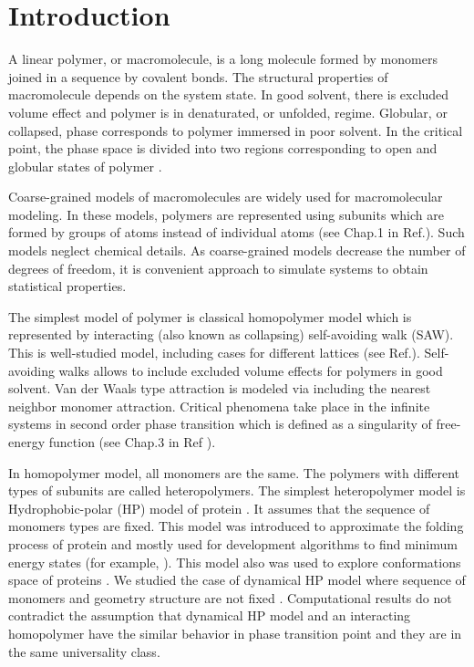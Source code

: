 \chapter{Introduction} \label{ch:intro}
\par A linear polymer, or macromolecule, is a long molecule formed by monomers joined in a sequence by covalent bonds. The structural properties of macromolecule depends on the system state.  In good solvent, there is excluded volume effect and polymer is in denaturated, or unfolded, regime. Globular, or collapsed, phase corresponds to polymer immersed in poor solvent. In the
critical point, the phase space is divided into two regions corresponding to open and globular states
of polymer \cite{van2015statistical}.

Coarse-grained models of macromolecules are widely used for macromolecular modeling. In these models, polymers are represented using subunits which are formed by groups of atoms instead of individual atoms (see Chap.1 in Ref.\cite{binder}). Such models neglect chemical details. As coarse-grained models decrease the number of degrees of freedom, it is convenient approach to simulate systems to obtain statistical properties.  

The simplest model of polymer is classical homopolymer model which is represented by interacting (also known as collapsing) self-avoiding walk (SAW). This is well-studied model, including cases for different lattices (see Ref.\cite{van2015statistical, vanderzande1998lattice}). Self-avoiding walks allows to include excluded volume effects for polymers in good solvent. Van der Waals type attraction is modeled via including the nearest neighbor monomer attraction. Critical phenomena take place in the infinite systems in second order phase transition which is defined as a singularity of free-energy function (see Chap.3 in Ref \cite{phasetransition}).

In homopolymer model, all monomers are the same. The polymers with different types of subunits are called heteropolymers. The simplest heteropolymer model is Hydrophobic-polar (HP) model of protein \cite{lau1989lattice}. It assumes that the sequence of monomers types are fixed. This model was introduced to approximate the folding process of protein and mostly used for development algorithms to find minimum energy states (for example, \cite{fress, PhysRevE.68.021113}). This model also was used to explore conformations space of proteins \cite{HELLING2001157}. We studied the case of dynamical HP model where sequence of monomers and geometry structure are not fixed \cite{Faizullina2021}. Computational results do not contradict the assumption that dynamical HP model  and an interacting homopolymer have the similar behavior in phase transition point and they are in the same universality class.

